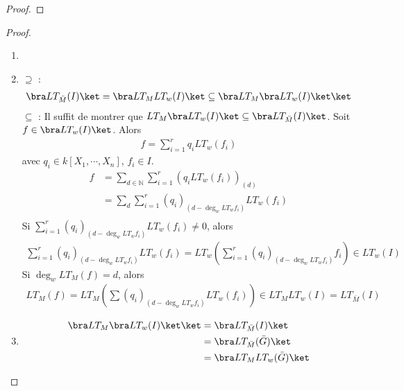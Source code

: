         \begin{proof}
        \end{proof}
        \begin{proof}
            \begin{enumerate}
                \item {}
                \item $\supseteq$ : 
                \begin{align*}
                    \bra LT_{\bar M}(I) \ket = \bra LT_M LT_w(I) \ket \subseteq \bra LT_M \bra LT_w(I) \ket \ket 
                \end{align*}
                $\subseteq$ : Il suffit de montrer que $LT_M \bra LT_w(I) \ket \subseteq \bra LT_{\bar M}(I) \ket$. Soit $f \in \bra LT_w(I) \ket$. Alors 
                \begin{align*}
                    f = \sum_{i = 1}^r q_i LT_w(f_i)
                \end{align*}
                avec $q_i \in k[X_1, \cdots, X_n]$, $f_i \in I$.
                \begin{align*}
                    f &= \sum_{d \in \mathbb{N}} \sum_{i = 1}^r (q_i LT_w(f_i))_{(d)} \\
                    &= \sum_d \sum_{i = 1}^r (q_i)_{(d - \deg_w LT_w f_i)} LT_w(f_i) \\
                \end{align*}
                Si $\sum_{i = 1}^r (q_i)_{(d - \deg_w LT_w f_i)} LT_w(f_i) \neq 0$, alors
                \begin{align*}
                    \sum_{i = 1}^r (q_i)_{(d - \deg_w LT_w f_i)} LT_w(f_i) = LT_w \left( \sum_{i = 1}^r (q_i)_{(d - \deg_w LT_w f_i)} f_i \right) \in LT_w(I) 
                \end{align*}
                Si $\deg_w LT_M(f) = d$, alors
                \begin{align*}
                    LT_M(f) = LT_M \left( \sum (q_i)_{(d - \deg_w LT_w f_i)} LT_w(f_i) \right) \in LT_M LT_w(I) = LT_{\bar M}(I)
                \end{align*}
                \item
                \begin{align*}
                    \bra LT_M \bra LT_w(I) \ket \ket &= \bra LT_{\bar M}(I) \ket \\
                    &= \bra LT_{\bar M}(\bar G) \ket \\
                    &= \bra LT_M LT_w(\bar G) \ket
                \end{align*}
            \end{enumerate}
        \end{proof}
